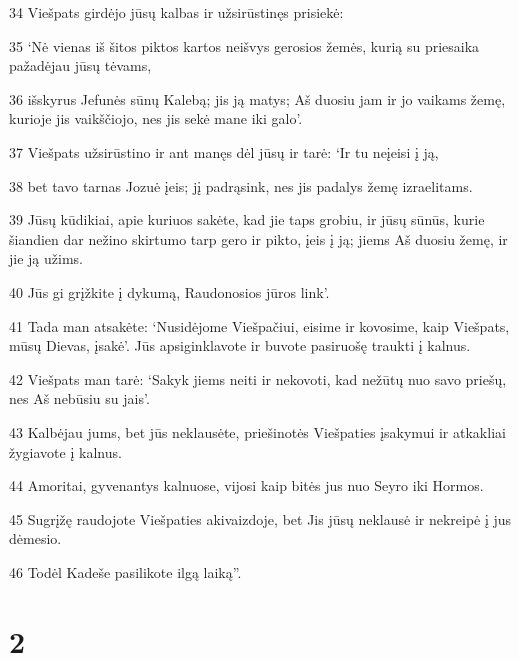 \par 34 Viešpats girdėjo jūsų kalbas ir užsirūstinęs prisiekė: 
\par 35 ‘Nė vienas iš šitos piktos kartos neišvys gerosios žemės, kurią su priesaika pažadėjau jūsų tėvams, 
\par 36 išskyrus Jefunės sūnų Kalebą; jis ją matys; Aš duosiu jam ir jo vaikams žemę, kurioje jis vaikščiojo, nes jis sekė mane iki galo’. 
\par 37 Viešpats užsirūstino ir ant manęs dėl jūsų ir tarė: ‘Ir tu neįeisi į ją, 
\par 38 bet tavo tarnas Jozuė įeis; jį padrąsink, nes jis padalys žemę izraelitams. 
\par 39 Jūsų kūdikiai, apie kuriuos sakėte, kad jie taps grobiu, ir jūsų sūnūs, kurie šiandien dar nežino skirtumo tarp gero ir pikto, įeis į ją; jiems Aš duosiu žemę, ir jie ją užims. 
\par 40 Jūs gi grįžkite į dykumą, Raudonosios jūros link’. 
\par 41 Tada man atsakėte: ‘Nusidėjome Viešpačiui, eisime ir kovosime, kaip Viešpats, mūsų Dievas, įsakė’. Jūs apsiginklavote ir buvote pasiruošę traukti į kalnus. 
\par 42 Viešpats man tarė: ‘Sakyk jiems neiti ir nekovoti, kad nežūtų nuo savo priešų, nes Aš nebūsiu su jais’. 
\par 43 Kalbėjau jums, bet jūs neklausėte, priešinotės Viešpaties įsakymui ir atkakliai žygiavote į kalnus. 
\par 44 Amoritai, gyvenantys kalnuose, vijosi kaip bitės jus nuo Seyro iki Hormos. 
\par 45 Sugrįžę raudojote Viešpaties akivaizdoje, bet Jis jūsų neklausė ir nekreipė į jus dėmesio. 
\par 46 Todėl Kadeše pasilikote ilgą laiką”.


\chapter{2}


